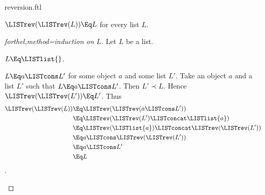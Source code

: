 \documentclass{stex}
\begin{document}
\begin{smodule}{reversion.ftl}
\begin{proposition}[forthel,id=LISTS_REV_1021563255448756]
  $\LISTrev(\LISTrev(L)) \Eq L$ for every list $L$.
\end{proposition}
\begin{proof}[forthel,method=induction on $L$]
  Let $L$ be a list.

  \begin{case}{$L \Eq \LISTlist{}$.}\end{case}

  \begin{case}{$L \Eq a \LISTcons L'$ for some object $a$ and some list $L'$.}
    Take an object $a$ and a list $L'$ such that $L \Eq a \LISTcons L'$.
    Then $L' \prec L$.
    Hence $\LISTrev(\LISTrev(L')) \Eq L'$.
    Thus
    \begin{align*}
      \LISTrev(\LISTrev(L))
        &\Eq \LISTrev(\LISTrev(a \LISTcons L'))\\
        &\Eq \LISTrev(\LISTrev(L') \LISTconcat \LISTlist{a})\\
        &\Eq \LISTrev(\LISTlist{a}) \LISTconcat \LISTrev(\LISTrev(L'))\\
        &\Eq a \LISTcons \LISTrev(\LISTrev(L'))\\
        &\Eq a \LISTcons L'\\
        &\Eq L
    \end{align*}.
  \end{case}
\end{proof}
\end{smodule}
\end{document}
